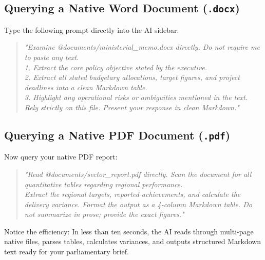 \documentclass[11pt, a4paper]{report}
\begin{document}
\subsection{Querying a Native Word Document (\texttt{.docx})}
Type the following prompt directly into the AI sidebar:
\begin{quote}
\small
\textit{"Examine @documents/ministerial\_memo.docx directly. Do not require me to paste any text. \\
1. Extract the core policy objective stated by the executive. \\
2. Extract all stated budgetary allocations, target figures, and project deadlines into a clean Markdown table. \\
3. Highlight any operational risks or ambiguities mentioned in the text. \\
Rely strictly on this file. Present your response in clean Markdown."}
\end{quote}

\subsection{Querying a Native PDF Document (\texttt{.pdf})}
Now query your native PDF report:
\begin{quote}
\small
\textit{"Read @documents/sector\_report.pdf directly. Scan the document for all quantitative tables regarding regional performance. \\
Extract the regional targets, reported achievements, and calculate the delivery variance. Format the output as a 4-column Markdown table. Do not summarize in prose; provide the exact figures."}
\end{quote}

Notice the efficiency: In less than ten seconds, the AI reads through multi-page native files, parses tables, calculates variances, and outputs structured Markdown text ready for your parliamentary brief.

\vspace{1.5em}
\noindent{}
\vspace{1.5em}

\newpage
\end{document}
